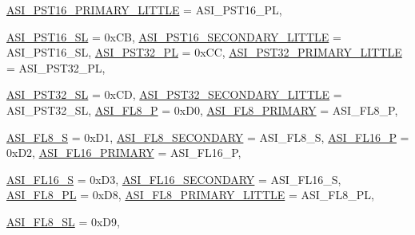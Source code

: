 \begin{DoxyCompactItemize}
\hyperlink{namespaceSparcISA_a6dd43f1311515252b283f56d7095a1f3a25be2600736f7e850a79a52b66a93132}{ASI\_\-PST16\_\-PRIMARY\_\-LITTLE} =  ASI\_\-PST16\_\-PL, 
\par
\hyperlink{namespaceSparcISA_a6dd43f1311515252b283f56d7095a1f3a9d4512b60debc8d5b2d0f9edd0f5e85d}{ASI\_\-PST16\_\-SL} =  0xCB, 
\hyperlink{namespaceSparcISA_a6dd43f1311515252b283f56d7095a1f3a2d59e9bfecb9dcc56c375fa72c497b37}{ASI\_\-PST16\_\-SECONDARY\_\-LITTLE} =  ASI\_\-PST16\_\-SL, 
\hyperlink{namespaceSparcISA_a6dd43f1311515252b283f56d7095a1f3a01ecf8d372b235eb79d7a3f339237b25}{ASI\_\-PST32\_\-PL} =  0xCC, 
\hyperlink{namespaceSparcISA_a6dd43f1311515252b283f56d7095a1f3a1b491d9a6775ad32f8cb7965bcb7b46d}{ASI\_\-PST32\_\-PRIMARY\_\-LITTLE} =  ASI\_\-PST32\_\-PL, 
\par
\hyperlink{namespaceSparcISA_a6dd43f1311515252b283f56d7095a1f3aa480b576fde4e1fe9d0758072e982c3a}{ASI\_\-PST32\_\-SL} =  0xCD, 
\hyperlink{namespaceSparcISA_a6dd43f1311515252b283f56d7095a1f3a2d9f9496133544f30805290c70da8407}{ASI\_\-PST32\_\-SECONDARY\_\-LITTLE} =  ASI\_\-PST32\_\-SL, 
\hyperlink{namespaceSparcISA_a6dd43f1311515252b283f56d7095a1f3a6a6185d9c85af7cb5b3ec22ef5fc210f}{ASI\_\-FL8\_\-P} =  0xD0, 
\hyperlink{namespaceSparcISA_a6dd43f1311515252b283f56d7095a1f3aa418601bcb3232c1b8f722604b71279c}{ASI\_\-FL8\_\-PRIMARY} =  ASI\_\-FL8\_\-P, 
\par
\hyperlink{namespaceSparcISA_a6dd43f1311515252b283f56d7095a1f3aeda1e851b56fd62406f0fd72a7f83475}{ASI\_\-FL8\_\-S} =  0xD1, 
\hyperlink{namespaceSparcISA_a6dd43f1311515252b283f56d7095a1f3a1246c2e5ab3364e8a5cd3d3194304fd7}{ASI\_\-FL8\_\-SECONDARY} =  ASI\_\-FL8\_\-S, 
\hyperlink{namespaceSparcISA_a6dd43f1311515252b283f56d7095a1f3a62ee8342f57abeae272b8ac8176480c5}{ASI\_\-FL16\_\-P} =  0xD2, 
\hyperlink{namespaceSparcISA_a6dd43f1311515252b283f56d7095a1f3a35c3b29a7e005f3b429ba7a3a754d5e1}{ASI\_\-FL16\_\-PRIMARY} =  ASI\_\-FL16\_\-P, 
\par
\hyperlink{namespaceSparcISA_a6dd43f1311515252b283f56d7095a1f3a184bf9ebb8d5c9fb6b23aee418e1019b}{ASI\_\-FL16\_\-S} =  0xD3, 
\hyperlink{namespaceSparcISA_a6dd43f1311515252b283f56d7095a1f3af86a28628006185068d3ca3797170100}{ASI\_\-FL16\_\-SECONDARY} =  ASI\_\-FL16\_\-S, 
\hyperlink{namespaceSparcISA_a6dd43f1311515252b283f56d7095a1f3a6383a5644d84071edc6d2d840b608609}{ASI\_\-FL8\_\-PL} =  0xD8, 
\hyperlink{namespaceSparcISA_a6dd43f1311515252b283f56d7095a1f3aa5a7a796d16ad76a015cb66ab45746b6}{ASI\_\-FL8\_\-PRIMARY\_\-LITTLE} =  ASI\_\-FL8\_\-PL, 
\par
\hyperlink{namespaceSparcISA_a6dd43f1311515252b283f56d7095a1f3a35db3f97d9ebf826116a94b6d10a38f0}{ASI\_\-FL8\_\-SL} =  0xD9, 

\end{DoxyCompactItemize}
